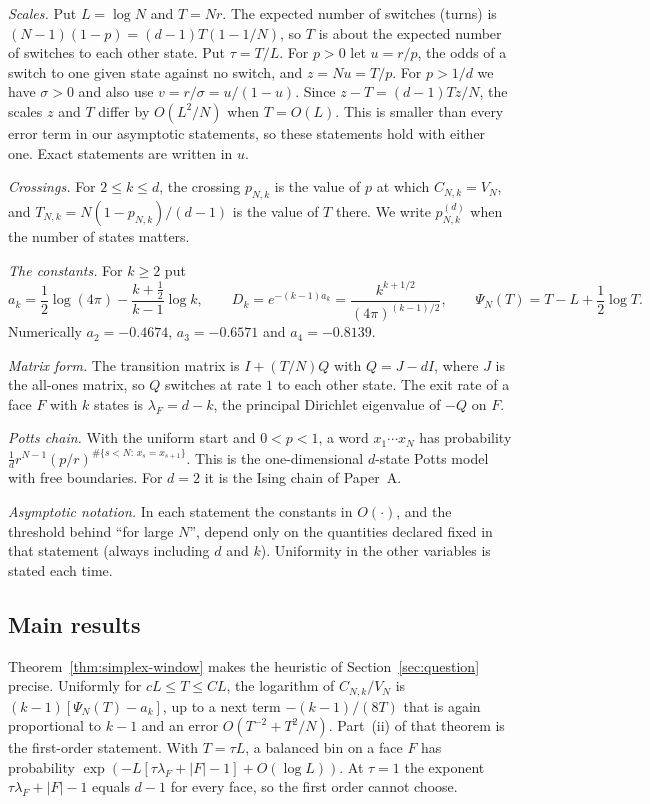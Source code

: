 \documentclass[11pt]{article}
\theoremstyle{definition}
\theoremstyle{remark}
\begin{document}
\emph{Scales.} Put $L=\log N$ and $T=Nr$. The expected number of switches (turns) is
$(N-1)(1-p)=(d-1)T(1-1/N)$, so $T$ is about the expected number of switches to
each other state. Put $\tau=T/L$. For $p>0$ let $u=r/p$, the odds of a switch
to one given state against no switch, and $z=Nu=T/p$. For $p>1/d$ we have
$\sigma>0$ and also use $v=r/\sigma=u/(1-u)$. Since $z-T=(d-1)Tz/N$, the scales
$z$ and $T$ differ by $O(L^2/N)$ when $T=O(L)$. This is smaller than every error
term in our asymptotic statements, so these statements hold with either one.
Exact statements are written in $u$.

\emph{Crossings.} For $2\le k\le d$, the crossing $p_{N,k}$ is the value of $p$
at which $C_{N,k}=V_N$, and $T_{N,k}=N(1-p_{N,k})/(d-1)$ is the value of $T$
there. We write $p^{(d)}_{N,k}$ when the number of states matters.

\emph{The constants.} For $k\ge2$ put
\begin{equation}\label{eq:intro-ak}
a_k=\frac12\log(4\pi)-\frac{k+\frac12}{k-1}\log k,\qquad
D_k=e^{-(k-1)a_k}=\frac{k^{k+1/2}}{(4\pi)^{(k-1)/2}},\qquad
\Psi_N(T)=T-L+\frac12\log T .
\end{equation}
Numerically $a_2=-0.4674$, $a_3=-0.6571$ and $a_4=-0.8139$.

\emph{Matrix form.} The transition matrix is $I+(T/N)Q$ with $Q=J-dI$, where $J$
is the all-ones matrix, so $Q$ switches at rate $1$ to each other state. The
exit rate of a face $F$ with $k$ states is $\lambda_F=d-k$, the principal
Dirichlet eigenvalue of $-Q$ on $F$.

\emph{Potts chain.} With the uniform start and $0<p<1$, a word $x_1\cdots x_N$
has probability $\frac1dr^{N-1}(p/r)^{\#\{s<N:\,x_s=x_{s+1}\}}$. This is the
one-dimensional $d$-state Potts model with free boundaries. For $d=2$ it is
the Ising chain of Paper~A.

\emph{Asymptotic notation.} In each statement the constants in $O(\cdot)$, and
the threshold behind ``for large $N$'', depend only on the quantities declared
fixed in that statement (always including $d$ and $k$). Uniformity in the other
variables is stated each time.

\subsection{Main results}\label{sec:results}

Theorem~\ref{thm:simplex-window} makes the heuristic of
Section~\ref{sec:question} precise. Uniformly for $cL\le T\le CL$, the
logarithm of $C_{N,k}/V_N$ is $(k-1)[\Psi_N(T)-a_k]$, up to a next term
$-(k-1)/(8T)$ that is again proportional to $k-1$ and an error
$O(T^{-2}+T^2/N)$. Part~(ii) of that theorem is the first-order statement. With
$T=\tau L$, a balanced bin on a face $F$ has probability
$\exp(-L[\tau\lambda_F+|F|-1]+O(\log L))$. At $\tau=1$ the exponent
$\tau\lambda_F+|F|-1$ equals $d-1$ for every face, so the first order cannot
choose.
\end{document}
